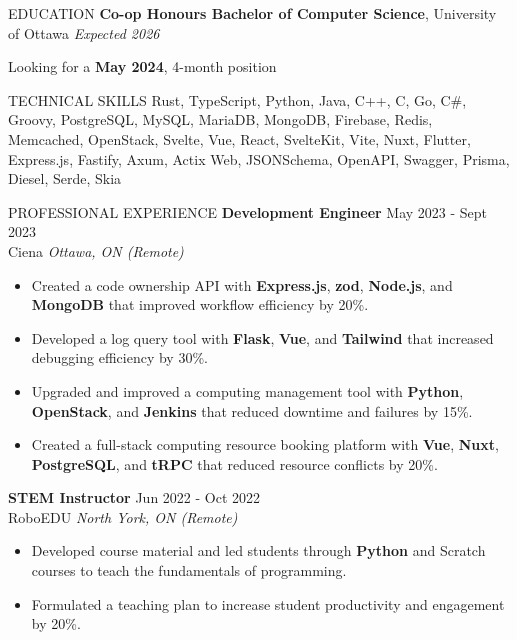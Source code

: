\documentclass{resume}
\begin{document}
\color{primary}

\vspace{-8pt}

\begin{rSection}{EDUCATION}
	{\textbf{Co-op Honours Bachelor of Computer Science}}, University of Ottawa \hfill \textit{Expected 2026}
	\vspace{-8pt}
	\begin{flushright}
		{Looking for a \textbf{May 2024}, 4-month position}
	\end{flushright}
\end{rSection}

\vspace{-8pt}

\begin{rSection}{TECHNICAL SKILLS}
	Rust, TypeScript, Python, Java, C++, C, Go, C\#, Groovy, PostgreSQL, MySQL, MariaDB, MongoDB, Firebase, Redis, Memcached, OpenStack, Svelte, Vue, React, SvelteKit, Vite, Nuxt, Flutter, Express.js, Fastify, Axum, Actix Web, JSONSchema, OpenAPI, Swagger, Prisma, Diesel, Serde, Skia
\end{rSection}

\vspace{-8pt}

\begin{rSection}{PROFESSIONAL EXPERIENCE}
	\textbf{Development Engineer} \hfill May 2023 - Sept 2023 \\ Ciena \hfill \textit{Ottawa, ON (Remote)}

	\begin{itemize}
		\itemsep -4pt {}
		\item Created a code ownership API with \textbf{Express.js}, \textbf{zod}, \textbf{Node.js}, and \textbf{MongoDB} that improved workflow efficiency by 20\%.
		\item Developed a log query tool with \textbf{Flask}, \textbf{Vue}, and \textbf{Tailwind} that increased debugging efficiency by 30\%.
		\item Upgraded and improved a computing management tool with \textbf{Python}, \textbf{OpenStack}, and \textbf{Jenkins} that reduced downtime and failures by 15\%.
		\item Created a full-stack computing resource booking platform with \textbf{Vue}, \textbf{Nuxt}, \textbf{PostgreSQL}, and \textbf{tRPC} that reduced resource conflicts by 20\%.
	\end{itemize}

	\textbf{STEM Instructor} \hfill Jun 2022 - Oct 2022 \\ RoboEDU \hfill \textit{North York, ON (Remote)}

	\begin{itemize}
		\itemsep -4pt {}
		\item Developed course material and led students through \textbf{Python} and Scratch courses to teach the fundamentals of programming.
		\item Formulated a teaching plan to increase student productivity and engagement by 20\%.
	\end{itemize}
\end{rSection}
\end{document}
